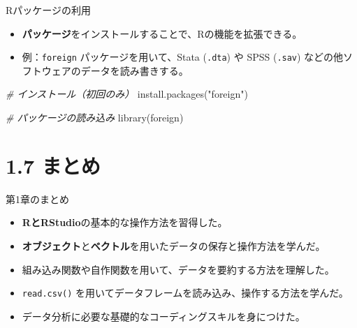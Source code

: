 \documentclass[
  ignorenonframetext,
]{beamer}
\newenvironment{Shaded}{\begin{snugshade}}{\end{snugshade}}
\newcommand{\CommentTok}[1]{\textcolor[rgb]{0.56,0.35,0.01}{\textit{#1}}}
\newcommand{\FunctionTok}[1]{\textcolor[rgb]{0.00,0.00,0.00}{#1}}
\newcommand{\NormalTok}[1]{#1}
\newcommand{\StringTok}[1]{\textcolor[rgb]{0.31,0.60,0.02}{#1}}
\providecommand{\tightlist}{%
  \setlength{\itemsep}{0pt}\setlength{\parskip}{0pt}}
\begin{document}
\begin{frame}[fragile]{Rパッケージの利用}
\protect\hypertarget{rux30d1ux30c3ux30b1ux30fcux30b8ux306eux5229ux7528}{}
\begin{itemize}
\tightlist
\item
  \textbf{パッケージ}をインストールすることで、Rの機能を拡張できる。
\item
  例：\texttt{foreign} パッケージを用いて、Stata (\texttt{.dta}) や SPSS
  (\texttt{.sav}) などの他ソフトウェアのデータを読み書きする。
\end{itemize}

\begin{Shaded}
\begin{Highlighting}[]
\CommentTok{\# インストール（初回のみ）}
\FunctionTok{install.packages}\NormalTok{(}\StringTok{"foreign"}\NormalTok{)}

\CommentTok{\# パッケージの読み込み}
\FunctionTok{library}\NormalTok{(foreign)}
\end{Highlighting}
\end{Shaded}
\end{frame}

\hypertarget{ux307eux3068ux3081}{%
\section{1.7 まとめ}\label{ux307eux3068ux3081}}

\begin{frame}[fragile]{第1章のまとめ}
\protect\hypertarget{ux7b2c1ux7ae0ux306eux307eux3068ux3081}{}
\begin{itemize}
\tightlist
\item
  \textbf{RとRStudio}の基本的な操作方法を習得した。
\item
  \textbf{オブジェクト}と\textbf{ベクトル}を用いたデータの保存と操作方法を学んだ。
\item
  組み込み関数や自作関数を用いて、データを要約する方法を理解した。
\item
  \texttt{read.csv()}
  を用いてデータフレームを読み込み、操作する方法を学んだ。
\item
  データ分析に必要な基礎的なコーディングスキルを身につけた。
\end{itemize}
\end{frame}
\end{document}
